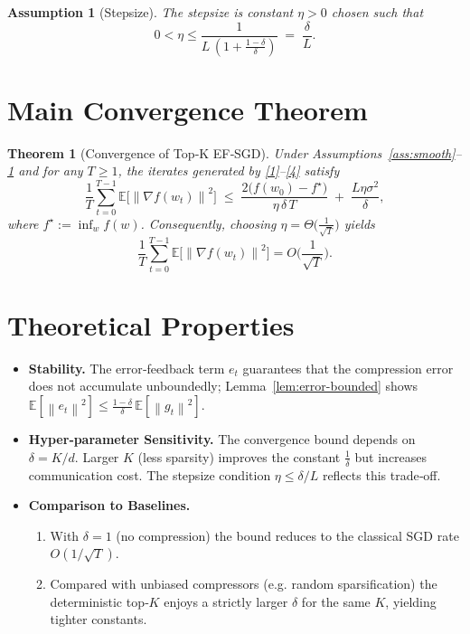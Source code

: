 \documentclass{article}
\newtheorem{theorem}{Theorem}
\newtheorem{assumption}{Assumption}
\newcommand{\E}{\mathbb{E}}
\newcommand{\norm}[1]{\left\lVert#1\right\rVert}
\begin{document}
\begin{assumption}[Stepsize]\label{ass:stepsize}
The stepsize is constant $\eta>0$ chosen such that
\[
0<\eta\le\frac{1}{L\,(1+\frac{1-\delta}{\delta})}\;=\;\frac{\delta}{L}.
\]
\end{assumption}

\section*{Main Convergence Theorem}
\begin{theorem}[Convergence of Top‑K EF‑SGD]\label{thm:main}
Under Assumptions~\ref{ass:smooth}–\ref{ass:stepsize} and for any $T\ge1$, the iterates generated by \eqref{1}–\eqref{4} satisfy
\[
\frac{1}{T}\sum_{t=0}^{T-1}\E\!\big[\norm{\nabla f(w_t)}^2\big]
\;\le\;
\frac{2\big(f(w_0)-f^\star\big)}{\eta\,\delta\,T}
\;+\;
\frac{L\eta\sigma^2}{\delta},
\tag{5}
\]
where $f^\star:=\inf_{w}f(w)$. Consequently, choosing $\eta=\Theta\!\big(\frac{1}{\sqrt{T}}\big)$ yields
\[
\frac{1}{T}\sum_{t=0}^{T-1}\E\!\big[\norm{\nabla f(w_t)}^2\big]=O\!\Big(\frac{1}{\sqrt{T}}\Big).
\]
\end{theorem}

\section*{Theoretical Properties}
\begin{itemize}[leftmargin=*]
\item \textbf{Stability.} The error‑feedback term $e_t$ guarantees that the compression error does not accumulate unboundedly; Lemma~\ref{lem:error-bounded} shows $\E[\norm{e_t}^2]\le \frac{1-\delta}{\delta}\,\E[\norm{g_t}^2]$.
\item \textbf{Hyper‑parameter Sensitivity.} The convergence bound depends on $\delta=K/d$. Larger $K$ (less sparsity) improves the constant $\frac{1}{\delta}$ but increases communication cost. The stepsize condition $\eta\le\delta/L$ reflects this trade‑off.
\item \textbf{Comparison to Baselines.}
\begin{enumerate}
\item With $\delta=1$ (no compression) the bound reduces to the classical SGD rate $O(1/\sqrt{T})$.
\item Compared with unbiased compressors (e.g. random sparsification) the deterministic top‑$K$ enjoys a strictly larger $\delta$ for the same $K$, yielding tighter constants.
\end{enumerate}
\end{itemize}
\end{document}
